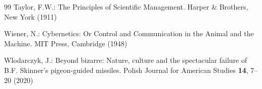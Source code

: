 \documentclass[runningheads]{llncs}
\begin{document}
\begin{thebibliography}{99}
Taylor, F.W.: The Principles of Scientific Management. Harper \& Brothers, New York (1911)

Wiener, N.: Cybernetics: Or Control and Communication in the Animal and the Machine. MIT Press, Cambridge (1948)

Wlodarczyk, J.: Beyond bizarre: Nature, culture and the spectacular failure of B.F. Skinner's pigeon-guided missiles. Polish Journal for American Studies \textbf{14}, 7--20 (2020)

\end{thebibliography}
\end{document}
